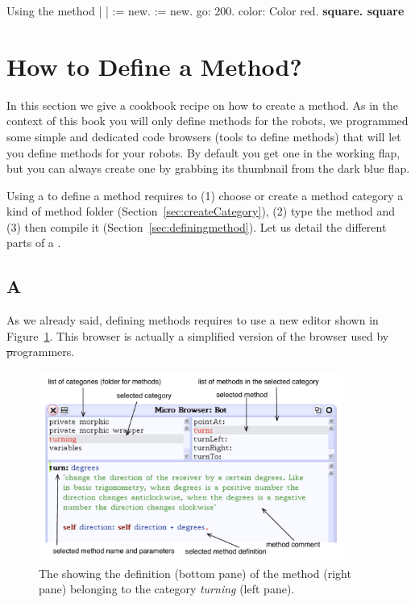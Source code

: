 \begin{scriptwithtitle}{Using the method }\label{src:againSquareMethod}
| \caro \daly | 
\caro := \Turtle new.  
\daly := \Turtle new.  
\daly go: 200.  
\daly color: Color red.
\textbf{\caro square.
\daly square}
\end{scriptwithtitle}


\section{How to Define a Method?}
In this section we give a cookbook recipe on how to create a method. 
As in the context of this book you will only define methods for the robots, we programmed some simple and dedicated code browsers (\ie tools to define methods) that will let you define methods for your robots. By default you get one \tb in the working flap, but you can always create one by grabbing its thumbnail from the dark blue flap. 
   
Using a \tb to define a method requires to (1) choose or create a method
category \ie a kind of method folder (Section~\ref{sec:createCategory}), (2) type the method and (3) then compile it (Section~\ref{sec:definingmethod}). Let us detail the different parts of a \tb.

\subsection{A \tb}
As we already said, defining methods requires to use a new editor shown in Figure~\ref{fig:methodEditor}. This browser is actually a simplified version of the browser used by \st programmers. 

\begin{figure}
\centerline{\includegraphics[width=10cm]{tbOneAnnotated}} 
\caption{The \tb showing the definition (bottom pane) of the 
method  (right pane) belonging to the category \emph{turning} (left pane).\label{fig:methodEditor}}
\end{figure}

